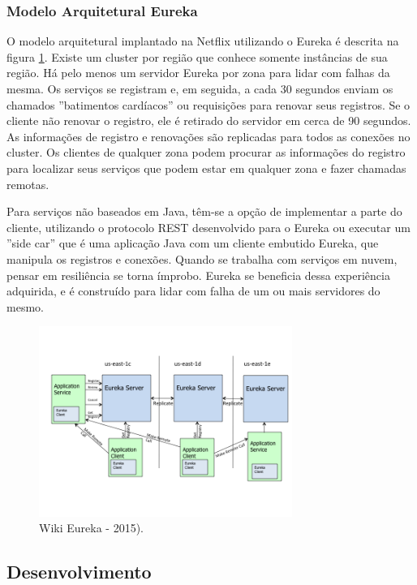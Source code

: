\documentclass[journal]{IEEEtran}
\begin{document}
\subsubsection{Modelo Arquitetural Eureka}
O modelo arquitetural implantado na Netflix utilizando o Eureka é descrita na figura \ref{fig:wiki-eureka-est}. Existe um cluster por região que conhece somente instâncias de sua região. Há pelo menos um servidor Eureka por zona para lidar com falhas da mesma. Os serviços se registram e, em seguida, a cada 30 segundos enviam os chamados ''batimentos cardíacos'' ou requisições para renovar seus registros. Se o cliente não renovar o registro, ele é retirado do servidor em cerca de 90 segundos. As informações de registro e renovações são replicadas para todos as conexões no cluster. Os clientes de qualquer zona podem procurar as informações do registro para localizar seus serviços que podem estar em qualquer zona e fazer chamadas remotas.

Para serviços não baseados em Java, têm-se a opção de implementar a parte do cliente, utilizando o protocolo REST desenvolvido para o Eureka ou executar um ''side car'' que é uma aplicação Java com um cliente embutido Eureka, que manipula os registros e conexões. Quando se trabalha com serviços em nuvem, pensar em resiliência se torna ímprobo. Eureka se beneficia dessa experiência adquirida, e é construído para lidar com falha de um ou mais servidores do mesmo.

\begin{figure}[h]
\centering
\includegraphics[height=6.2cm]{figura6}
\caption{Wiki Eureka - 2015).}
\label{fig:wiki-eureka-est}
\end{figure}
 




\subsection{Desenvolvimento}
\end{document}
